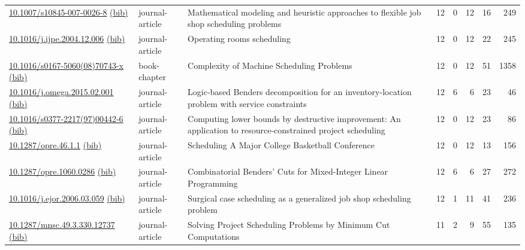 {\begin{longtable}{p{5cm}lp{11cm}rrrrr}
\href{http://dx.doi.org/10.1007/s10845-007-0026-8}{10.1007/s10845-007-0026-8} \href{https://www.doi2bib.org/bib/10.1007/s10845-007-0026-8}{(bib)} & journal-article & Mathematical modeling and heuristic approaches to flexible job shop scheduling problems & 12 & 0 & 12 & 16 & 249 \\
\href{http://dx.doi.org/10.1016/j.ijpe.2004.12.006}{10.1016/j.ijpe.2004.12.006} \href{https://www.doi2bib.org/bib/10.1016/j.ijpe.2004.12.006}{(bib)} & journal-article & Operating rooms scheduling & 12 & 0 & 12 & 22 & 245 \\
\href{http://dx.doi.org/10.1016/s0167-5060(08)70743-x}{10.1016/s0167-5060(08)70743-x} \href{https://www.doi2bib.org/bib/10.1016/s0167-5060(08)70743-x}{(bib)} & book-chapter & Complexity of Machine Scheduling Problems & 12 & 0 & 12 & 51 & 1358 \\
\href{http://dx.doi.org/10.1016/j.omega.2015.02.001}{10.1016/j.omega.2015.02.001} \href{https://www.doi2bib.org/bib/10.1016/j.omega.2015.02.001}{(bib)} & journal-article & Logic-based Benders decomposition for an inventory-location problem with service constraints & 12 & 6 & 6 & 23 & 46 \\
\href{http://dx.doi.org/10.1016/s0377-2217(97)00442-6}{10.1016/s0377-2217(97)00442-6} \href{https://www.doi2bib.org/bib/10.1016/s0377-2217(97)00442-6}{(bib)} & journal-article & Computing lower bounds by destructive improvement: An application to resource-constrained project scheduling & 12 & 0 & 12 & 23 & 86 \\
\href{http://dx.doi.org/10.1287/opre.46.1.1}{10.1287/opre.46.1.1} \href{https://www.doi2bib.org/bib/10.1287/opre.46.1.1}{(bib)} & journal-article & Scheduling A Major College Basketball Conference & 12 & 0 & 12 & 13 & 156 \\
\href{http://dx.doi.org/10.1287/opre.1060.0286}{10.1287/opre.1060.0286} \href{https://www.doi2bib.org/bib/10.1287/opre.1060.0286}{(bib)} & journal-article & Combinatorial Benders' Cuts for Mixed-Integer Linear Programming & 12 & 6 & 6 & 27 & 272 \\
\href{http://dx.doi.org/10.1016/j.ejor.2006.03.059}{10.1016/j.ejor.2006.03.059} \href{https://www.doi2bib.org/bib/10.1016/j.ejor.2006.03.059}{(bib)} & journal-article & Surgical case scheduling as a generalized job shop scheduling problem & 12 & 1 & 11 & 41 & 236 \\
\href{http://dx.doi.org/10.1287/mnsc.49.3.330.12737}{10.1287/mnsc.49.3.330.12737} \href{https://www.doi2bib.org/bib/10.1287/mnsc.49.3.330.12737}{(bib)} & journal-article & Solving Project Scheduling Problems by Minimum Cut Computations & 11 & 2 & 9 & 55 & 135 \\

\end{longtable}}
